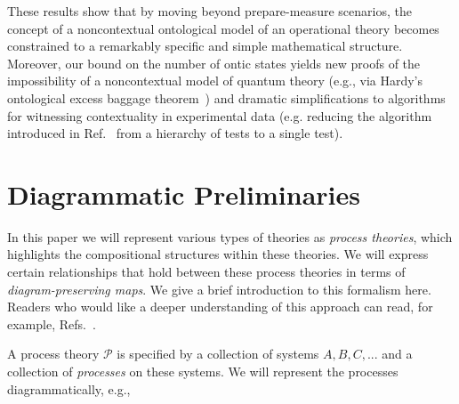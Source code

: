 \documentclass[onecolum,aps,groupedaddress,nofootinbib]{revtex4-2}
\begin{document}
These results show that by moving beyond prepare-measure scenarios, the concept of a noncontextual ontological model of an operational theory becomes constrained to a remarkably specific and simple mathematical structure. Moreover, our bound on the number of ontic states yields new proofs of the impossibility of a noncontextual model of quantum theory (e.g., via Hardy's ontological excess baggage theorem~\cite{Hardy2004}) and dramatic simplifications to algorithms for witnessing contextuality in experimental data (e.g. reducing the algorithm introduced in Ref.~\cite{schmid2019characterization} from a hierarchy of tests to a single test).


\section{Diagrammatic Preliminaries}

In this paper we will represent
various types of theories as \emph{process theories}, which highlights the compositional structures within these theories.
We will express certain relationships that hold between these process theories in terms of \emph{diagram-preserving maps}. We give a brief introduction to this formalism here. Readers who would like a deeper understanding of this approach can read, for example, Refs.~\cite{coecke2017picturing,coecke2015categorical,selbyReconstruction,gogioso2017categorical,schmid2020unscrambling}.

A process theory $\mathcal{P}$ is specified by a collection of systems $A, B, C, ...$ and a collection of \emph{processes} on these systems.
We will represent the processes diagrammatically, e.g.,
\end{document}
